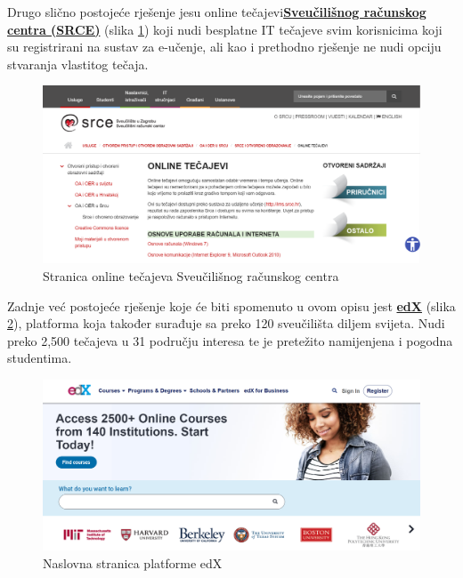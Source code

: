 	Drugo slično postojeće rješenje jesu online tečajevi\href{https://www.srce.unizg.hr/otvoreni-pristup-i-otvoreni-obrazovni-sadrzaji/oa-i-oer-u-srcu/srce-i-otvoreno-obrazovanje/online-tecajevi}{\textbf{Sveučilišnog računskog centra (SRCE)}}  (slika \ref{fig:SRCE}) koji nudi besplatne IT tečajeve svim korisnicima koji su registrirani na sustav za e-učenje, ali kao i prethodno rješenje ne nudi opciju stvaranja vlastitog tečaja.
	
	\begin{figure}[H]
		\includegraphics[scale=0.4]{slike/SRCE.PNG} 
		\centering
		\caption{Stranica online tečajeva Sveučilišnog računskog centra}
		\label{fig:SRCE}
	\end{figure}  
	
	Zadnje već postojeće rješenje koje će biti spomenuto u ovom opisu jest \href{https://www.edx.org/}{\textbf{edX}} (slika \ref{fig:edX}), platforma koja također surađuje sa preko 120 sveučilišta diljem svijeta. Nudi preko 2,500 tečajeva u 31 području interesa te je pretežito namijenjena i pogodna studentima. 
	
	\begin{figure}[H]
		\includegraphics[scale=0.4]{slike/edX.PNG} 
		\centering
		\caption{Naslovna stranica platforme edX}
		\label{fig:edX}
	\end{figure} 

